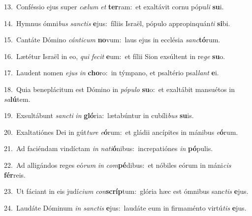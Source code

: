 {\numbfont\textcolor{\numbcolor}{13.}}~Conféssio ejus super \textit{cæ}\-\textit{lum} \textit{et} \textbf{ter}\-ram:~\star et exaltávit cornu pópu\textit{li} \textbf{su}\-i.\par
{\numbfont\textcolor{\numbcolor}{14.}}~Hymnus ómni\textit{bus} \textit{sanc}\-\textit{tis} \textbf{e}\-jus:~\star fíliis Israël, pópulo appropinquán\textit{ti} \textbf{si}\-bi.\par
{\numbfont\textcolor{\numbcolor}{15.}}~Cantáte Dómino \textit{cán}\-\textit{ti}\textit{cum} \textbf{no}\-vum:~\star laus ejus in ecclésia \textit{sanc}\-\textbf{tó}rum.\par
{\numbfont\textcolor{\numbcolor}{16.}}~Lætétur Israël in eo, \textit{qui} \textit{fe}\-\textit{cit} \textbf{e}\-um:~\star et fílii Sion exsúltent in re\textit{ge} \textbf{su}\-o.\par
{\numbfont\textcolor{\numbcolor}{17.}}~Laudent nomen \textit{e}\-\textit{jus} \textit{in} \textbf{cho}\-ro:~\star in týmpano, et psaltério psal\textit{lant} \textbf{e}\-i.\par
{\numbfont\textcolor{\numbcolor}{18.}}~Quia beneplácitum est Dómino in \textit{pó}\-\textit{pu}\textit{lo} \textbf{su}\-o:~\star et exaltábit mansuétos in \textit{sa}\-\textbf{lú}tem.\par
{\numbfont\textcolor{\numbcolor}{19.}}~Exsultábunt \textit{sanc}\-\textit{ti} \textit{in} \textbf{gló}\-ria:~\star lætabúntur in cubíli\textit{bus} \textbf{su}\-is.\par
{\numbfont\textcolor{\numbcolor}{20.}}~Exaltatiónes Dei in gút\-\textit{tu}\-\textit{re} \textit{e}\-\textbf{ó}rum:~\star et gládii ancípites in mánibus \textit{e}\-\textbf{ó}rum.\par
{\numbfont\textcolor{\numbcolor}{21.}}~Ad faciéndam vindíctam \textit{in} \textit{na}\-\textit{ti}\textbf{ó}nibus:~\star increpatiónes \textit{in} \textbf{pó}\-pulis.\par
{\numbfont\textcolor{\numbcolor}{22.}}~Ad alligándos reges eó\textit{rum} \textit{in} \textit{com}\-\textbf{pé}dibus:~\star et nóbiles eórum in máni\textit{cis} \textbf{fér}\-reis.\par
{\numbfont\textcolor{\numbcolor}{23.}}~Ut fáciant in eis judí\-\textit{ci}\-\textit{um} \textit{con}\-\textbf{scríp}tum:~\star glória hæc est ómnibus sanc\textit{tis} \textbf{e}\-jus.\par
{\numbfont\textcolor{\numbcolor}{24.}}~Laudáte Dóminum \textit{in} \textit{sanc}\-\textit{tis} \textbf{e}\-jus:~\star laudáte eum in firmaménto virtú\textit{tis} \textbf{e}\-jus.\par
